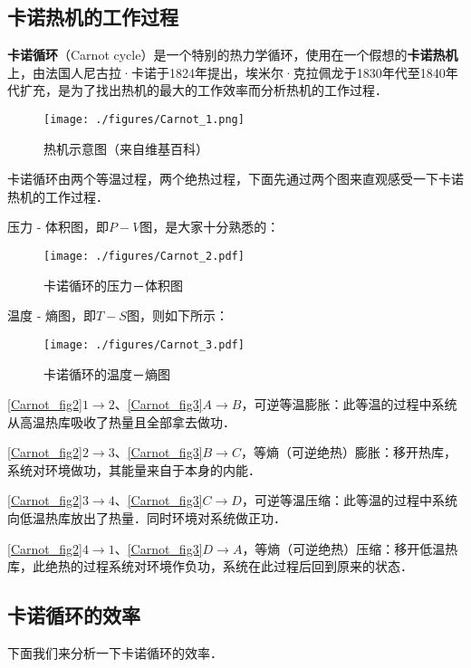 
\subsection{卡诺热机的工作过程}
\textbf{卡诺循环}（Carnot cycle）是一个特别的热力学循环，使用在一个假想的\textbf{卡诺热机}上，由法国人尼古拉·卡诺于1824年提出，埃米尔·克拉佩龙于1830年代至1840年代扩充，是为了找出热机的最大的工作效率而分析热机的工作过程．

\begin{figure}[ht]
\centering
\texttt{[image: ./figures/Carnot\_1.png]}
\caption{热机示意图（来自维基百科）} \label{Carnot_fig1}
\end{figure}
卡诺循环由两个等温过程，两个绝热过程，下面先通过两个图来直观感受一下卡诺热机的工作过程．

压力 - 体积图，即$P-V$图，是大家十分熟悉的：
\begin{figure}[ht]
\centering
\texttt{[image: ./figures/Carnot\_2.pdf]}
\caption{卡诺循环的压力－体积图} \label{Carnot_fig2}
\end{figure}

温度 - 熵图，即$T-S$图，则如下所示：
\begin{figure}[ht]
\centering
\texttt{[image: ./figures/Carnot\_3.pdf]}
\caption{卡诺循环的温度－熵图} \label{Carnot_fig3}
\end{figure}

\autoref{Carnot_fig2}$1\to 2$、\autoref{Carnot_fig3}$A\to B$，可逆等温膨胀：此等温的过程中系统从高温热库吸收了热量且全部拿去做功．

\autoref{Carnot_fig2}$2\to 3$、\autoref{Carnot_fig3}$B\to C$，等熵（可逆绝热）膨胀：移开热库，系统对环境做功，其能量来自于本身的内能．

\autoref{Carnot_fig2}$3\to 4$、\autoref{Carnot_fig3}$C\to D$，可逆等温压缩：此等温的过程中系统向低温热库放出了热量．同时环境对系统做正功．

\autoref{Carnot_fig2}$4\to 1$、\autoref{Carnot_fig3}$D\to A$，等熵（可逆绝热）压缩：移开低温热库，此绝热的过程系统对环境作负功，系统在此过程后回到原来的状态．

\subsection{卡诺循环的效率}

下面我们来分析一下卡诺循环的效率．

